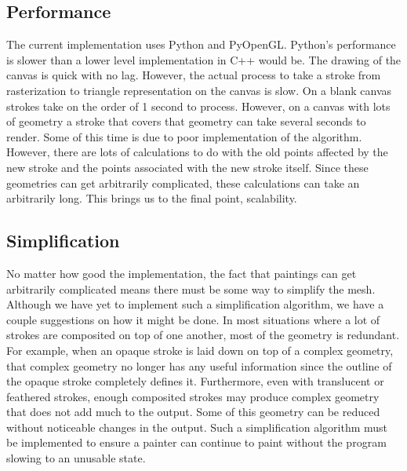 \documentclass[conference]{acmsiggraph}
\begin{document}
\subsection{Performance}
The current implementation uses Python and PyOpenGL. Python's performance is slower than
a lower level implementation in C++ would be. The drawing of the canvas is quick with
no lag. However, the actual process to take a stroke from rasterization to triangle
representation on the canvas is slow. On a blank canvas strokes take on the order of
1 second to process. However, on a canvas with lots of geometry a stroke that covers
that geometry can take several seconds to render. Some of this time is due to poor
implementation of the algorithm. However, there are lots of calculations
to do with the old points affected by the new stroke and the points associated with the
new stroke itself. Since these geometries can get arbitrarily complicated, these
calculations can take an arbitrarily long. This brings us to the final point, scalability.

\subsection{Simplification}
No matter how good the implementation, the fact that paintings can get arbitrarily complicated
means there must be some way to simplify the mesh. Although we have yet to implement
such a simplification algorithm, we have a couple suggestions on how it might be done. In most situations where
a lot of strokes are composited on top of one another, most of the geometry is redundant. 
For example, when an opaque stroke is laid down on top of a complex geometry, that complex
geometry no longer has any useful information since the outline of the opaque stroke
completely defines it. Furthermore, even with translucent or feathered strokes, enough
composited strokes may produce complex geometry that does not add much to the output.
Some of this geometry can be reduced without noticeable changes in the output. Such a
simplification algorithm must be implemented to ensure a painter can continue to paint
without the program slowing to an unusable state.



\end{document}

